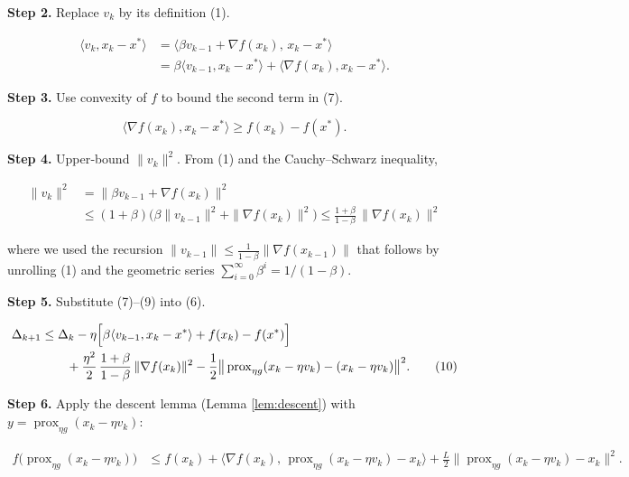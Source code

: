 \documentclass{article}
\newcommand{\prox}{\operatorname{prox}}
\begin{document}
\noindent\textbf{Step 2.} Replace $v_{k}$ by its definition (1).  

\[
\begin{aligned}
\langle v_{k},x_{k}-x^{*}\rangle
&=\langle\beta v_{k-1}+\nabla f(x_{k}),\,x_{k}-x^{*}\rangle\\
&=\beta\langle v_{k-1},x_{k}-x^{*}\rangle+\langle\nabla f(x_{k}),x_{k}-x^{*}\rangle .
\tag{7}
\end{aligned}
\]

\noindent\textbf{Step 3.} Use convexity of $f$ to bound the second term in (7).  

\[
\langle\nabla f(x_{k}),x_{k}-x^{*}\rangle
\ge f(x_{k})-f(x^{*}) .
\tag{8}
\]

\noindent\textbf{Step 4.} Upper‑bound $\|v_{k}\|^{2}$.
From (1) and the Cauchy–Schwarz inequality,

\[
\begin{aligned}
\|v_{k}\|^{2}
&=\|\beta v_{k-1}+\nabla f(x_{k})\|^{2}\\
&\le (1+\beta)\bigl(\beta\|v_{k-1}\|^{2}+\|\nabla f(x_{k})\|^{2}\bigr)
\le \frac{1+\beta}{1-\beta}\,\|\nabla f(x_{k})\|^{2}
\tag{9}
\end{aligned}
\]

where we used the recursion $\|v_{k-1}\|\le \frac{1}{1-\beta}\|\nabla f(x_{k-1})\|$ that follows by unrolling (1) and the geometric series $\sum_{i=0}^{\infty}\beta^{i}=1/(1-\beta)$.

\noindent\textbf{Step 5.} Substitute (7)–(9) into (6).  

\[
\begin{aligned}
\Delta_{k+1}
&\le \Delta_{k}
      -\eta\Bigl[\beta\langle v_{k-1},x_{k}-x^{*}\rangle
                +f(x_{k})-f(x^{*})\Bigr] \\
&\qquad +\frac{\eta^{2}}{2}\,\frac{1+\beta}{1-\beta}\,\|\nabla f(x_{k})\|^{2}
      -\frac12\bigl\|\,\prox_{\eta g}(x_{k}-\eta v_{k})-(x_{k}-\eta v_{k})\bigr\|^{2}.
\tag{10}
\end{aligned}
\]

\noindent\textbf{Step 6.} Apply the descent lemma (Lemma \ref{lem:descent}) with $y=\prox_{\eta g}(x_{k}-\eta v_{k})$:

\[
\begin{aligned}
f\bigl(\prox_{\eta g}(x_{k}-\eta v_{k})\bigr)
&\le f(x_{k})+\langle\nabla f(x_{k}),\,
            \prox_{\eta g}(x_{k}-\eta v_{k})-x_{k}\rangle
      +\frac{L}{2}\bigl\|\prox_{\eta g}(x_{k}-\eta v_{k})-x_{k}\bigr\|^{2}.
\tag{11}
\end{aligned}
\]
\end{document}
